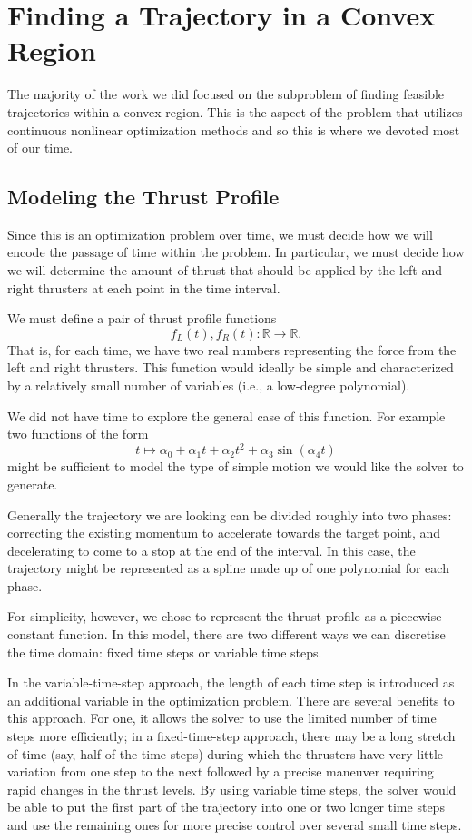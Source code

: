 \documentclass{report}
\begin{document}

\chapter{Finding a Trajectory in a Convex Region} \label{chap:subregion}
The majority of the work we did focused on the subproblem of finding feasible
trajectories within a convex region. This is the aspect of the problem that utilizes
continuous nonlinear optimization methods and so this is where we devoted most
of our time.
\section{Modeling the Thrust Profile}
Since this is an optimization problem over time, we must decide how we will encode
the passage of time within the problem. In particular, we must decide how we will
determine the amount of thrust that should be applied by the left and right thrusters
at each point in the time interval.

We must define a pair of thrust profile functions
\[ f_L(t), f_R(t) : \mathbb{R} \to \mathbb{R}. \]
That is, for each time, we have two real numbers representing the force from the left and right
thrusters.
This function would ideally be simple and characterized by a relatively small number of variables (i.e.,
a low-degree polynomial).

We did not have time to explore the general case of this function. For example two functions of the form
\[ t \mapsto \alpha_0 + \alpha_1 t + \alpha_2 t^2 + \alpha_3 \sin(\alpha_4 t) \]
might be sufficient to model the type of simple motion we would like the solver to generate.

Generally the trajectory we are looking can be divided roughly into
two phases: correcting the existing momentum to accelerate towards the target point, and 
decelerating to come to a stop at the end of the interval. In this case, the trajectory
might be represented as a spline made up of one polynomial for each phase.

For simplicity, however, we chose to represent the thrust profile as a piecewise constant
function. In this model, there are two different ways we can discretise the time domain:
fixed time steps or variable time steps.

In the variable-time-step approach, the length of each time step is introduced as an additional
variable in the optimization problem. There are several benefits to this approach.
For one, it allows the solver to use the limited number of time steps more efficiently; in a
fixed-time-step approach, there may be a long stretch of time (say, half of the time steps)
during which the thrusters have very little variation from one step to the next followed by a
precise maneuver requiring rapid changes in the thrust levels. By using variable time steps,
the solver would be able to put the first part of the trajectory into one or two longer time steps
and use the remaining ones for more precise control over several small time steps.
\end{document}
